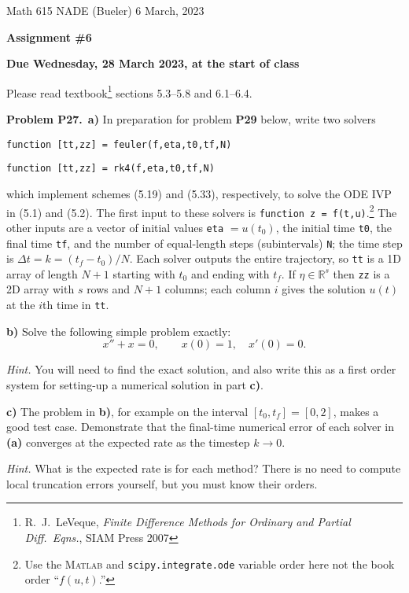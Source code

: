 \documentclass[12pt]{amsart}
\newcommand{\RR}{\mathbb{R}}
\newcommand{\Matlab}{\textsc{Matlab}\xspace}
\newcommand{\prob}[1]{\bigskip\noindent\textbf{#1}\quad }
\newcommand{\epart}[1]{\medskip\noindent\textbf{#1)}\quad }
\newcommand{\ppart}[1]{\,\textbf{#1)}\quad }
\begin{document}
\scriptsize \noindent Math 615 NADE (Bueler) \hfill 6 March, 2023
\normalsize

\medskip\bigskip

\Large\centerline{\textbf{Assignment \#6}}
\large
\bigskip

\centerline{\textbf{Due Wednesday, 28 March 2023, at the start of class}}
\bigskip
\normalsize

\thispagestyle{empty}

\bigskip
Please read textbook\footnote{R.~J.~LeVeque, \emph{Finite Difference Methods for Ordinary and Partial Diff.~Eqns.}, SIAM Press 2007} sections 5.3--5.8 and 6.1--6.4.


\medskip
\prob{Problem P27.}  \ppart{a}  In preparation for problem \textbf{P29} below, write two solvers

\centerline{\texttt{function [tt,zz] = feuler(f,eta,t0,tf,N)}}

\centerline{\texttt{function [tt,zz] = rk4(f,eta,t0,tf,N)}}

\noindent which implement schemes (5.19) and (5.33), respectively, to solve the ODE IVP in (5.1) and (5.2).  The first input to these solvers is \texttt{function z = f(t,u)}.\footnote{Use the \Matlab and \texttt{scipy.integrate.ode} variable order here not the book order ``$f(u,t)$.''}  The other inputs are a vector of initial values \texttt{eta} $= u(t_0)$, the initial time \texttt{t0}, the final time \texttt{tf}, and the number of equal-length steps (subintervals) \texttt{N}; the time step is $\Delta t = k = (t_f-t_0)/N$.  Each solver outputs the entire trajectory, so \texttt{tt} is a 1D array of length $N+1$ starting with $t_0$ and ending with $t_f$.  If $\eta\in\RR^s$ then \texttt{zz} is a 2D array with $s$ rows and $N+1$ columns; each column $i$ gives the solution $u(t)$ at the $i$th time in \texttt{tt}.

\epart{b}  Solve the following simple problem exactly:
    $$x'' + x = 0, \qquad x(0)=1, \quad x'(0)=0.$$

\medskip
\noindent \emph{Hint.}  You will need to find the exact solution, and also write this as a first order system for setting-up a numerical solution in part \textbf{c)}.

\epart{c} The problem in \textbf{b)}, for example on the interval $[t_0,t_f] = [0,2]$, makes a good test case.  Demonstrate that the final-time numerical error of each solver in \textbf{(a)} converges at the expected rate as the timestep $k\to 0$.

\medskip
\noindent \emph{Hint.} What is the expected rate is for each method?  There is no need to compute local truncation errors yourself, but you must know their orders.
\end{document}
